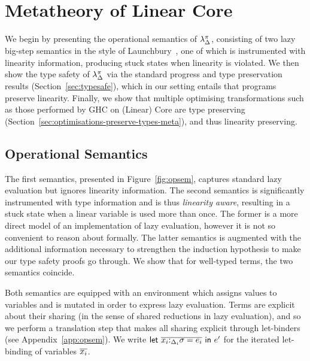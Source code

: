\documentclass[acmsmall,review,anonymous,screen]{acmart}
\newcommand{\llet}[2]{\mathsf{let}~#1~\mathsf{in}~#2}
\begin{document}
\section{Metatheory of Linear Core\label{sec:main:metatheory}}

We begin by presenting the operational semantics of $\lambda^\pi_\Delta$,
consisting of two lazy big-step semantics in the
style of Launchbury~\cite{10.1145/158511.158618}, one of which is
instrumented with linearity information, producing stuck states when
linearity is violated. We then show the
type safety  of $\lambda^\pi_\Delta$ via the standard progress  and type
preservation results (Section~\ref{sec:typesafe}), which in our setting entails that programs
preserve linearity. Finally, we show that multiple optimising
transformations such as those performed by GHC on (Linear) Core are
type preserving
(Section~\ref{sec:optimisations-preserve-types-meta}), and thus
linearity preserving.

\subsection{Operational Semantics}

The first semantics, presented in Figure~\ref{fig:opsem}, captures
standard lazy evaluation but ignores linearity information. The second
semantics is significantly instrumented with type information and is thus
\emph{linearity aware}, resulting in a stuck state when a linear
variable is used more than once. The former is a more direct model of
an implementation of lazy evaluation, however it is not so convenient
to reason about formally. The latter semantics is augmented with the additional
information necessary to strengthen the induction hypothesis to make our
type safety proofs go through.
%
We show that for well-typed terms, the two semantics coincide. 

Both semantics are
equipped with an environment which assigns values to variables and is
mutated in order to express lazy evaluation. Terms are explicit about
their sharing (in the sense of shared reductions in lazy evaluation),
and so we perform a translation step that makes all sharing explicit
through let-binders (see Appendix~\ref{app:opsem}).
We write $\llet{\ov{x_i{:}_{\Delta_i}\sigma = e_i}}{e'}$ for the iterated
let-binding of variables $\overline{x_i}$. 
\end{document}
